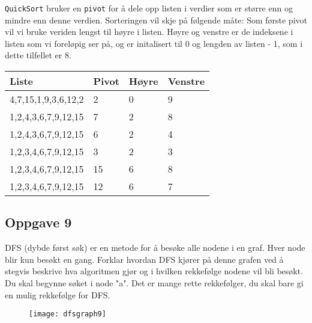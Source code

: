 \documentclass{article}
\begin{document}
    \begin{ans}

        \texttt{QuickSort} bruker en \texttt{pivot} for å dele opp listen i verdier som er større enn og mindre enn denne verdien. Sorteringen vil skje på følgende måte: Som første pivot vil vi bruke veriden lengst til høyre i listen. Høyre og venstre er de indeksene i listen som vi foreløpig ser på, og er initalisert til 0 og lengden av listen - 1, som i dette tilfellet er 8.

        \begin{table}[H]
            \begin{center}
                \begin{tabular}[c]{|l|l|l|l|}
                    \hline
                    Liste&Pivot&Høyre&Venstre  \\
                    \hline
                     4,7,15,1,9,3,6,12,2&2&0&9  \\
                    \hline
                     1,2,4,3,6,7,9,12,15&7&2&8 \\
                    \hline
                     1,2,4,3,6,7,9,12,15&6&2&4 \\
                    \hline
                     1,2,3,4,6,7,9,12,15&3&2&3 \\
                    \hline
                     1,2,3,4,6,7,9,12,15&15&6&8 \\
                    \hline
                     1,2,3,4,6,7,9,12,15&12&6&7 \\
                    \hline
                \end{tabular}
            \end{center}
        \end{table}
        
    \end{ans}

    \subsection{Oppgave 9}
    DFS (dybde først søk) er en metode for å besøke alle nodene i en graf. Hver node blir kun besøkt en gang. Forklar hvordan DFS kjører på denne grafen ved å stegvis beskrive hva algoritmen gjør og i hvilken rekkefølge nodene vil bli besøkt. Du skal begynne søket i node "a". Det er mange rette rekkefølger, du skal bare gi en mulig rekkefølge for DFS.

    \begin{figure}[H]
        \begin{center}
            \texttt{[image: dfsgraph9]}
        \end{center}
    \end{figure}
\end{document}
